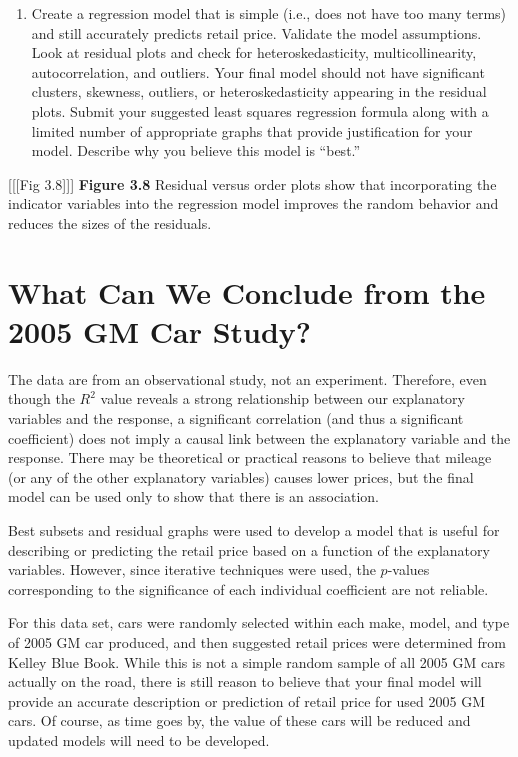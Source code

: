 \documentclass[
]{report}
\providecommand{\tightlist}{%
  \setlength{\itemsep}{0pt}\setlength{\parskip}{0pt}}
\begin{document}
\begin{enumerate}
\def\labelenumi{\arabic{enumi}.}
\setcounter{enumi}{20}
\tightlist
\item
  Create a regression model that is simple (i.e., does not have too many terms) and still accurately predicts retail price. Validate the model assumptions. Look at residual plots and check for heteroskedasticity, multicollinearity, autocorrelation, and outliers. Your final model should not have significant clusters, skewness, outliers, or heteroskedasticity appearing in the residual plots. Submit your suggested least squares regression formula along with a limited number of appropriate graphs that provide justification for your model. Describe why you believe this model is ``best.''
\end{enumerate}

{[}{[}{[}Fig 3.8{]}{]}{]}
\textbf{Figure 3.8} Residual versus order plots show that incorporating the indicator variables into the regression model improves the random behavior and reduces the sizes of the residuals.

\section{What Can We Conclude from the 2005 GM Car Study?}\label{what-can-we-conclude-from-the-2005-gm-car-study}

The data are from an observational study, not an experiment. Therefore, even though the \(R^2\) value reveals a strong relationship between our explanatory variables and the response, a significant correlation (and thus a significant coefficient) does not imply a causal link between the explanatory variable and the response. There may be theoretical or practical reasons to believe that mileage (or any of the other
explanatory variables) causes lower prices, but the final model can be used only to show that there is an association.

Best subsets and residual graphs were used to develop a model that is useful for describing or predicting the retail price based on a function of the explanatory variables. However, since iterative techniques were used, the \(p\)-values corresponding to the significance of each individual coefficient are not reliable.

For this data set, cars were randomly selected within each make, model, and type of 2005 GM car produced, and then suggested retail prices were determined from Kelley Blue Book. While this is not a simple random sample of all 2005 GM cars actually on the road, there is still reason to believe that your final model will provide an accurate description or prediction of retail price for used 2005 GM cars. Of course, as time goes by, the value of these cars will be reduced and updated models will need to be developed.
\end{document}
